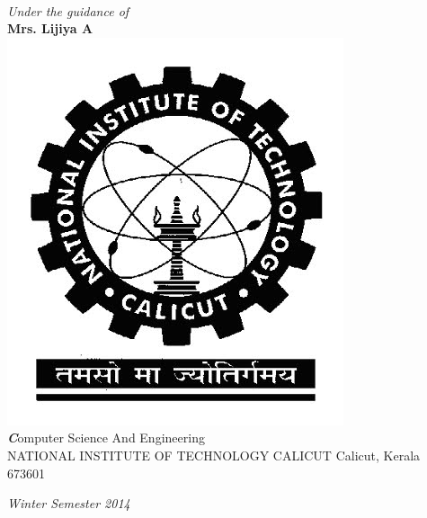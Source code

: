 \begin{titlepage}
\HRule \\[0.2cm]

\textit{\textit{Under the guidance of}}\\[0.1cm]
\textbf{\large Mrs. Lijiya A}\\[0.4cm]
\includegraphics[scale=0.25]{nitc}\\
\Large { \textit \textbf Computer Science And Engineering}\\
 \large {NATIONAL INSTITUTE OF TECHNOLOGY CALICUT}
 Calicut, Kerala 673601

\textit{\large Winter Semester 2014}\\[3cm] %


 

\vfill %

\end{titlepage}

